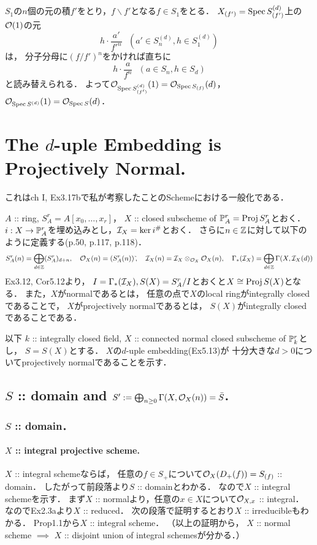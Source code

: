 \documentclass[a4paper]{jsarticle}
\begin{document}
    $S_1$の$n$個の元の積$f'$をとり，$f \backslash f'$となる$f \in S_1$をとる．
    $X_{(f')}=\operatorname{Spec} S_{(f')}^{(d)}$上の$\mathcal{O}(1)$の元
    \[ h \cdot \frac{a'}{f'^n} ~~~(a' \in S_n^{(d)}, h \in S_1^{(d)}) \]は，
    分子分母に$(f/f')^n$をかければ直ちに
    \[ h \cdot \frac{a}{f^{n}} ~~~ (a \in S_{n}, h \in S_d) \]と読み替えられる．
    よって$\mathcal{O}_{\operatorname{Spec} S_{(f')}^{(d)}}(1)=\mathcal{O}_{\operatorname{Spec} S_{(f)}}(d)$，
    $\mathcal{O}_{\operatorname{Spec} S^{(d)}}(1)=\mathcal{O}_{\operatorname{Spec} S}(d)$．

\section{The $d$-uple Embedding is Projectively Normal.} %
    これはch I, Ex3.17bで私が考察したことのSchemeにおける一般化である．

    $A$ :: ring, $S_A^r=A[x_0,\dots,x_r]$，
    $X$ :: closed subscheme of $\mathbb{P}^r_A=\operatorname{Proj} S_A^r$とおく．
    $i: X \to \mathbb{P}^r_A$を埋め込みとし，$\mathcal{I}_X=\ker i^{\#}$とおく．
    さらに$n \in \mathbb{Z}$に対して以下のように定義する(p.50, p.117, p.118)．
    \[
        S_A^r(n)=\bigoplus_{d \in \mathbb{Z}} (S_A^r)_{d+n},~~~
        \mathcal{O}_X(n)=(S_A^r(n))\,\tilde{},~~~
        \mathcal{I}_X(n)=\mathcal{I}_X \otimes_{\mathcal{O}_X} \mathcal{O}_X(n),~~~
        \Gamma_*(\mathcal{I}_X)=\bigoplus_{d \in \mathbb{Z}} \Gamma(X,\mathcal{I}_X(d))
    \]
    Ex3.12, Cor5.12より，
    $I=\Gamma_*(\mathcal{I}_X), S(X)=S_A^r/I$とおくと$X \cong \operatorname{Proj} S(X)$となる．
    また，$X$がnormalであるとは，
    任意の点で$X$のlocal ringがintegrally closedであることで，
    $X$がprojectively normalであるとは，
    $S(X)$がintegrally closedであることである．

    以下
    $k$ :: integrally closed field,
    $X$ :: connected normal closed subscheme of $\mathbb{P}_k^r$とし，
    $S=S(X)$とする．
    $X$の$d$-uple embedding(Ex5.13)が
    十分大きな$d>0$についてprojectively normalであることを示す．

    \subsection{$S$ :: domain and $S':=\bigoplus_{n \geq 0} \Gamma(X,\mathcal{O}_X(n))=\bar{S}$.}
    \subsubsection{$S$ :: domain．}
    \paragraph{$X$ :: integral projective scheme.}
    $X$ :: integral schemeならば，
    任意の$f \in S_+$について$\mathcal{O}_X(D_+(f))=S_{(f)}$ :: domain．
    したがって前段落より$S$ :: domainとわかる．
    なので$X$ :: integral schemeを示す．
    まず$X$ :: normalより，任意の$x \in X$について$\mathcal{O}_{X,x}$ :: integral．
    なのでEx2.3aより$X$ :: reduced．
    次の段落で証明するとおり$X$ :: irreducibleもわかる．
    Prop1.1から$X$ :: integral scheme．
    （以上の証明から，
    $X$ :: normal scheme $\implies$ $X$ :: disjoint union of integral schemesが分かる．）
\end{document}
